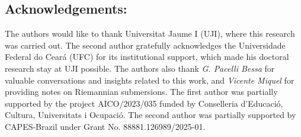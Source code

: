\documentclass{amsart}
\theoremstyle{definition}
\theoremstyle{remark}
\numberwithin{equation}{section}
\begin{document}
\subsection*{Acknowledgements:}
The authors would like to thank Universitat Jaume I (UJI), where this research was carried out. The second author gratefully acknowledges the Universidade Federal do Ceará (UFC) for its institutional support, which made his doctoral research stay at UJI possible. The authors also thank \emph{G. Pacelli Bessa} for valuable conversations and insights related to this work, and \emph{Vicente Miquel} for providing notes on Riemannian submersions. The first author was partially supported by the project AICO/2023/035 funded
by Conselleria d'Educació, Cultura, Universitats i Ocupació. The second author was partially supported by CAPES-Brazil under Grant No. 88881.126989/2025-01.
\end{document}
